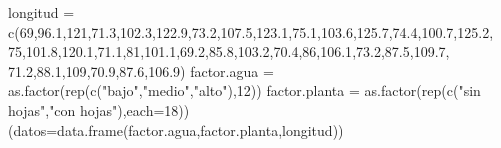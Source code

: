\documentclass[
]{article}
\newenvironment{Shaded}{\begin{snugshade}}{\end{snugshade}}
\newcommand{\AttributeTok}[1]{\textcolor[rgb]{0.77,0.63,0.00}{#1}}
\newcommand{\DecValTok}[1]{\textcolor[rgb]{0.00,0.00,0.81}{#1}}
\newcommand{\FloatTok}[1]{\textcolor[rgb]{0.00,0.00,0.81}{#1}}
\newcommand{\FunctionTok}[1]{\textcolor[rgb]{0.00,0.00,0.00}{#1}}
\newcommand{\NormalTok}[1]{#1}
\newcommand{\OtherTok}[1]{\textcolor[rgb]{0.56,0.35,0.01}{#1}}
\newcommand{\StringTok}[1]{\textcolor[rgb]{0.31,0.60,0.02}{#1}}
\begin{document}
\begin{Shaded}
\begin{Highlighting}[]
\NormalTok{longitud }\OtherTok{=} \FunctionTok{c}\NormalTok{(}\DecValTok{69}\NormalTok{,}\FloatTok{96.1}\NormalTok{,}\DecValTok{121}\NormalTok{,}\FloatTok{71.3}\NormalTok{,}\FloatTok{102.3}\NormalTok{,}\FloatTok{122.9}\NormalTok{,}\FloatTok{73.2}\NormalTok{,}\FloatTok{107.5}\NormalTok{,}\FloatTok{123.1}\NormalTok{,}\FloatTok{75.1}\NormalTok{,}\FloatTok{103.6}\NormalTok{,}\FloatTok{125.7}\NormalTok{,}\FloatTok{74.4}\NormalTok{,}\FloatTok{100.7}\NormalTok{,}\FloatTok{125.2}\NormalTok{,}
             \DecValTok{75}\NormalTok{,}\FloatTok{101.8}\NormalTok{,}\FloatTok{120.1}\NormalTok{,}\FloatTok{71.1}\NormalTok{,}\DecValTok{81}\NormalTok{,}\FloatTok{101.1}\NormalTok{,}\FloatTok{69.2}\NormalTok{,}\FloatTok{85.8}\NormalTok{,}\FloatTok{103.2}\NormalTok{,}\FloatTok{70.4}\NormalTok{,}\DecValTok{86}\NormalTok{,}\FloatTok{106.1}\NormalTok{,}\FloatTok{73.2}\NormalTok{,}\FloatTok{87.5}\NormalTok{,}\FloatTok{109.7}\NormalTok{,}
             \FloatTok{71.2}\NormalTok{,}\FloatTok{88.1}\NormalTok{,}\DecValTok{109}\NormalTok{,}\FloatTok{70.9}\NormalTok{,}\FloatTok{87.6}\NormalTok{,}\FloatTok{106.9}\NormalTok{)}
\NormalTok{factor.agua }\OtherTok{=} \FunctionTok{as.factor}\NormalTok{(}\FunctionTok{rep}\NormalTok{(}\FunctionTok{c}\NormalTok{(}\StringTok{"bajo"}\NormalTok{,}\StringTok{"medio"}\NormalTok{,}\StringTok{"alto"}\NormalTok{),}\DecValTok{12}\NormalTok{))}
\NormalTok{factor.planta }\OtherTok{=} \FunctionTok{as.factor}\NormalTok{(}\FunctionTok{rep}\NormalTok{(}\FunctionTok{c}\NormalTok{(}\StringTok{"sin hojas"}\NormalTok{,}\StringTok{"con hojas"}\NormalTok{),}\AttributeTok{each=}\DecValTok{18}\NormalTok{))}
\NormalTok{(}\AttributeTok{datos=}\FunctionTok{data.frame}\NormalTok{(factor.agua,factor.planta,longitud))}
\end{Highlighting}
\end{Shaded}
\end{document}
